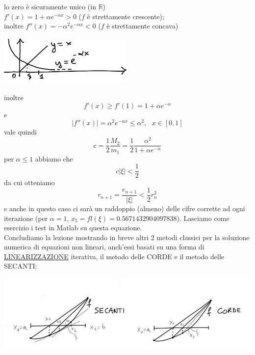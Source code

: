 \documentclass[12pt]{article}
\begin{document}
lo zero è sicuramente unico (in $\mathbb{R}$)\\
$f'(x)=1+\alpha e^{-\alpha x}>0$ ($f$ è strettamente crescente);\\
inoltre $f''(x)=-\alpha^2 e^{-\alpha x}<0$ ($f$ è strettamente concava)
\begin{center}
\includegraphics[width=0.5\textwidth]{pag34.png}
\end{center}
inoltre 
\begin{equation*}
    f'(x) \geq f'(1) = 1+ \alpha e^{-\alpha}
\end{equation*}
e
\begin{equation*}
    |f''(x)| = \alpha^2 e^{-\alpha x} \leq \alpha^2, \ \ \ x\in[0,1]
\end{equation*}
vale quindi
\begin{equation*}
    c = \frac{1}{2}\frac{M_2}{m_1} = \frac{1}{2}\frac{\alpha^2}{1+\alpha e^{-\alpha}}
\end{equation*}
per $\alpha \leq 1$ abbiamo che 
\begin{equation*}
    c|\xi| < \frac{1}{2}
\end{equation*}
da cui otteniamo
\begin{equation*}
    r_{n+1} = \frac{e_{n+1}}{|\xi|} < \frac{1}{2}r_n^2
\end{equation*}
e anche in questo caso ci sarà un raddoppio (almeno) delle cifre corrette ad ogni iterazione (per $\alpha = 1$, $x_5=fl(\xi)=0.5671432904097838$). Lasciamo come esercizio i test in Matlab su questa equazione.\\
Concludiamo la lezione mostrando in breve altri 2 metodi classici per la soluzione numerica di equazioni non lineari, anch'essi basati su una forma di \underline{LINEARIZZAZIONE} iterativa, il metodo delle CORDE e il metodo delle SECANTI:
\begin{center}
\includegraphics[width=\textwidth]{pag36.JPG}
\end{center}
\end{document}
